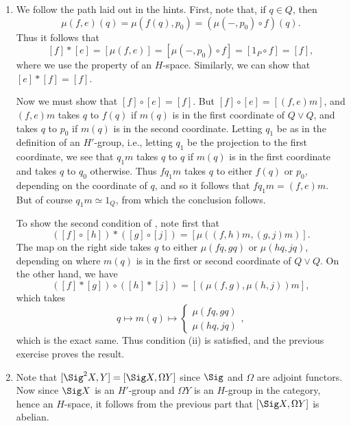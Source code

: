 \documentclass[../../solutions.tex]{subfiles}
\begin{document}
\begin{exercise} \leavevmode
\begin{enumerate}
\item
We follow the path laid out in the hints.
First, note that, if $q\in Q$, then
\[\mu(f,e)(q)=\mu(f(q),p_0)=(\mu(-,p_0)\circ f)(q).\]
Thus it follows that
\[[f]*[e]=[\mu(f,e)]=[\mu(-,p_0)\circ f]=[1_P\circ f]=[f],\]
where we use the property of an $H$-space.
Similarly, we can show that $[e]*[f]=[f]$.

Now we must show that $[f]\circ[e]=[f]$.
But $[f]\circ[e]=[(f,e)m]$, and $(f,e)m$ takes $q$ to $f(q)$ if $m(q)$ is in the first coordinate of $Q\vee Q$, and takes $q$ to $p_0$ if $m(q)$ is in the second coordinate.
Letting $q_1$ be as in the definition of an $H'$-group, i.e., letting $q_1$ be the projection to the first coordinate, we see that $q_1m$ takes $q$ to $q$ if $m(q)$ is in the first coordinate and takes $q$ to $q_0$ otherwise.
Thus $fq_1m$ takes $q$ to either $f(q)$ or $p_0$, depending on the coordinate of $q$, and so it follows that $fq_1m=(f,e)m$.
But of course $q_1m\simeq 1_Q$, from which the conclusion follows.

To show the second condition of , note first that
\[([f]\circ[h])*([g]\circ[j])=[\mu((f,h)m,(g,j)m)].\]
The map on the right side takes $q$ to either $\mu(fq,gq)$ or $\mu(hq,jq)$, depending on where $m(q)$ is in the first or second coordinate of $Q\vee Q$.
On the other hand, we have
\[([f]*[g])\circ([h]*[j])=[(\mu(f,g),\mu(h,j))m],\]
which takes
\[q\mapsto m(q)\mapsto\begin{cases}\mu(fq,gq)\\\mu(hq,jq)\end{cases},\]
which is the exact same.
Thus condition (ii) is satisfied, and the previous exercise proves the result.

\item
Note that $[\Sig^2X,Y]=[\Sig X,\Omega Y]$ since $\Sig$ and $\Omega$ are adjoint functors.
Now since $\Sig X$ is an $H'$-group and $\Omega Y$ is an $H$-group in the category, hence an $H$-space, it follows from the previous part that $[\Sig X,\Omega Y]$ is abelian.
\end{enumerate}
\end{exercise}
\end{document}
